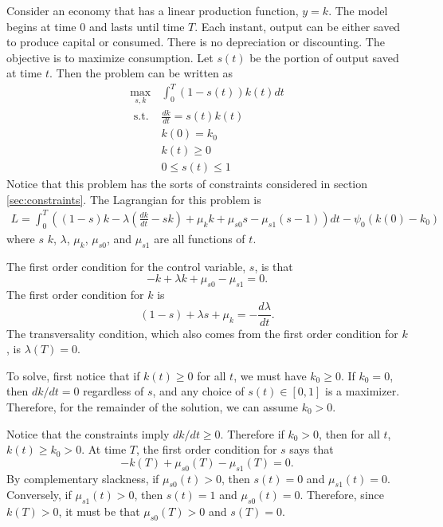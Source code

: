 \begin{example}
  Consider an economy that has a linear production function, $y =
  k$. The model begins at time $0$ and lasts until time $T$. Each
  instant, output can be either saved to produce capital or
  consumed. There is no depreciation or discounting. The objective is
  to maximize consumption. Let $s(t)$ be the portion of output saved
  at time $t$. Then the problem can be written as
  \begin{align*}
    \max_{s,k} & \int_0^T (1-s(t)) k(t) dt \\
    \text{ s.t. } & \frac{dk}{dt} = s(t)k(t) \\
    & k(0) = k_0 \\
    & k(t) \geq 0 \\
    & 0 \leq s(t) \leq 1
  \end{align*}
  Notice that this problem has the sorts of constraints considered in
  section \ref{sec:constraints}. 
  The Lagrangian for this problem is
  \begin{align*}
    L = \int_0^T \left((1-s)k -\lambda (\frac{dk}{dt} - sk) + \mu_kk
      +\mu_{s0}s - \mu_{s1}(s-1) \right) dt - \psi_0(k(0) - k_0)
  \end{align*}
  where $s$ $k$, $\lambda$, $\mu_{k}$, $\mu_{s0}$, and $\mu_{s1}$ are
  all functions of $t$. 
  
  The first order condition for the control variable, $s$, is that
  \[ -k + \lambda k + \mu_{s0} - \mu_{s1} = 0. \]
  The first order condition for $k$ is
  \[ (1-s) + \lambda s + \mu_k = -\frac{d\lambda}{dt}. \] The
  transversality condition, which also comes from the first order
  condition for $k$, is $\lambda(T) = 0$.  

  To solve, first notice that if $k(t) \geq 0$ for all $t$, we must
  have $k_0 \geq 0$. If $k_0 = 0$, then $dk/dt = 0$ regardless of $s$,
  and any choice of $s(t) \in [0,1]$ is a maximizer. Therefore, for
  the remainder of the solution, we can assume $k_0 > 0$. 
  
  Notice that the constraints imply $dk/dt \geq 0$. Therefore if
  $k_0>0$, then for all $t$, $k(t) \geq k_0 > 0$.   
  At time $T$, the first order condition for $s$ says that
  \[ -k(T) + \mu_{s0}(T) - \mu_{s1}(T) = 0. \]
  By complementary slackness, if $\mu_{s0}(t) > 0$, then
  $s(t) = 0$ and $\mu_{s1}(t) = 0$. Conversely, if $\mu_{s1}(t) > 0$,
  then $s(t) = 1$ and $\mu_{s0}(t) = 0$.  Therefore, since $k(T) > 0$, it
  must be that $\mu_{s0}(T) > 0$ and $s(T) = 0$.  


\end{example}
